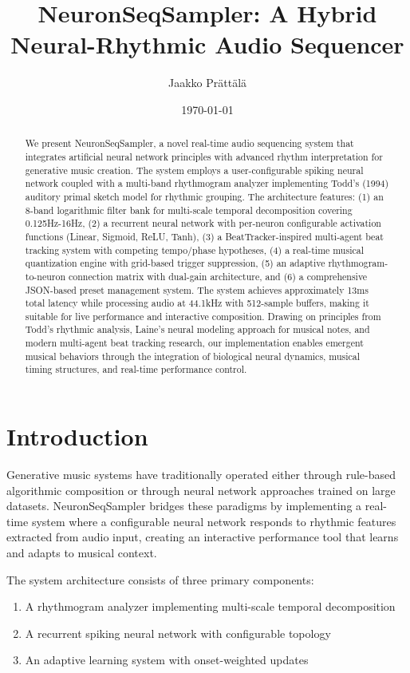 \documentclass[11pt,a4paper]{article}
\title{NeuronSeqSampler: A Hybrid Neural-Rhythmic Audio Sequencer}
\author{Jaakko Prättälä}
\date{\today}
\begin{document}
\maketitle

\begin{abstract}
We present NeuronSeqSampler, a novel real-time audio sequencing system that integrates artificial neural network principles with advanced rhythm interpretation for generative music creation. The system employs a user-configurable spiking neural network coupled with a multi-band rhythmogram analyzer implementing Todd's (1994) auditory primal sketch model for rhythmic grouping. The architecture features: (1) an 8-band logarithmic filter bank for multi-scale temporal decomposition covering 0.125Hz-16Hz, (2) a recurrent neural network with per-neuron configurable activation functions (Linear, Sigmoid, ReLU, Tanh), (3) a BeatTracker-inspired multi-agent beat tracking system with competing tempo/phase hypotheses, (4) a real-time musical quantization engine with grid-based trigger suppression, (5) an adaptive rhythmogram-to-neuron connection matrix with dual-gain architecture, and (6) a comprehensive JSON-based preset management system. The system achieves approximately 13ms total latency while processing audio at 44.1kHz with 512-sample buffers, making it suitable for live performance and interactive composition. Drawing on principles from Todd's rhythmic analysis, Laine's neural modeling approach for musical notes, and modern multi-agent beat tracking research, our implementation enables emergent musical behaviors through the integration of biological neural dynamics, musical timing structures, and real-time performance control.
\end{abstract}

\section{Introduction}

Generative music systems have traditionally operated either through rule-based algorithmic composition or through neural network approaches trained on large datasets. NeuronSeqSampler bridges these paradigms by implementing a real-time system where a configurable neural network responds to rhythmic features extracted from audio input, creating an interactive performance tool that learns and adapts to musical context.

The system architecture consists of three primary components:
\begin{enumerate}
\item A rhythmogram analyzer implementing multi-scale temporal decomposition \cite{todd1994}
\item A recurrent spiking neural network with configurable topology
\item An adaptive learning system with onset-weighted updates
\end{enumerate}
\end{document}
